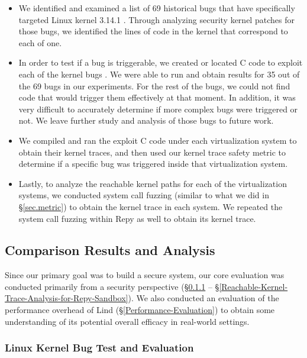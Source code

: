 \begin{itemize}
\item We identified and examined a list of  69 historical bugs that have
specifically
targeted Linux kernel 3.14.1 \cite{CVE-Datasource}. Through analyzing
security kernel patches for those bugs,
we identified the lines of code in the kernel that correspond to each of
one.

\item In order to test if a bug is triggerable, we created or located C
code to
exploit each of the kernel bugs \cite{Exploit-Database}. We were able to
run and obtain results for
35 out of the 69 bugs in our experiments. For the rest of the bugs,
we could not find code that would trigger them effectively at that
moment.
In addition, it was very difficult to accurately determine if more complex
bugs
were triggered or not. We leave further study and analysis of those bugs to
future work.

\item We compiled and ran the exploit C code under each virtualization
system to
obtain their kernel traces, and then used our kernel trace safety metric to
determine
if a specific bug was triggered inside that virtualization system.

\item Lastly, to  analyze the reachable kernel paths for each of the
virtualization systems,
we conducted system call fuzzing (similar to what we did in \S{\ref{sec.metric}}) to obtain
the kernel trace in each system.
We repeated the system call fuzzing within Repy as well to obtain its
kernel trace.
\end{itemize}

\subsection{Comparison Results and Analysis}

Since our primary goal was to build a secure system, our core evaluation
was conducted primarily
from a security perspective
(\S{\ref{Linux-Kernel-Bug-Test-and-Evaluation}} --
\S{\ref{Reachable-Kernel-Trace-Analysis-for-Repy-Sandbox}}).
We also conducted an evaluation of the performance overhead of Lind
(\S{\ref{Performance-Evaluation}})
to obtain some understanding of its potential overall efficacy in
real-world settings.

\subsubsection{Linux Kernel Bug Test and Evaluation}
\label{Linux-Kernel-Bug-Test-and-Evaluation}


